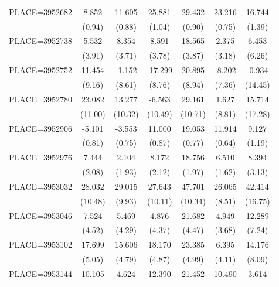 {\begin{tabular}{l*{6}{c}}
PLACE=3952682       &       8.852&      11.605&      25.881&      29.432&      23.216&      16.744\\
                    &      (0.94)&      (0.88)&      (1.04)&      (0.90)&      (0.75)&      (1.39)\\
PLACE=3952738       &       5.532&       8.354&       8.591&      18.565&       2.375&       6.453\\
                    &      (3.91)&      (3.71)&      (3.78)&      (3.87)&      (3.18)&      (6.26)\\
PLACE=3952752       &      11.454&      -1.152&     -17.299&      20.895&      -8.202&      -0.934\\
                    &      (9.16)&      (8.61)&      (8.76)&      (8.94)&      (7.36)&     (14.45)\\
PLACE=3952780       &      23.082&      13.277&      -6.563&      29.161&       1.627&      15.714\\
                    &     (11.00)&     (10.32)&     (10.49)&     (10.71)&      (8.81)&     (17.28)\\
PLACE=3952906       &      -5.101&      -3.553&      11.000&      19.053&      11.914&       9.127\\
                    &      (0.81)&      (0.75)&      (0.87)&      (0.77)&      (0.64)&      (1.19)\\
PLACE=3952976       &       7.444&       2.104&       8.172&      18.756&       6.510&       8.394\\
                    &      (2.08)&      (1.93)&      (2.12)&      (1.97)&      (1.62)&      (3.13)\\
PLACE=3953032       &      28.032&      29.015&      27.643&      47.701&      26.065&      42.414\\
                    &     (10.48)&      (9.93)&     (10.11)&     (10.34)&      (8.51)&     (16.75)\\
PLACE=3953046       &       7.524&       5.469&       4.876&      21.682&       4.949&      12.289\\
                    &      (4.52)&      (4.29)&      (4.37)&      (4.47)&      (3.68)&      (7.24)\\
PLACE=3953102       &      17.699&      15.606&      18.170&      23.385&       6.395&      14.176\\
                    &      (5.05)&      (4.79)&      (4.87)&      (4.99)&      (4.11)&      (8.09)\\
PLACE=3953144       &      10.105&       4.624&      12.390&      21.452&      10.490&       3.614\\

\end{tabular}}
